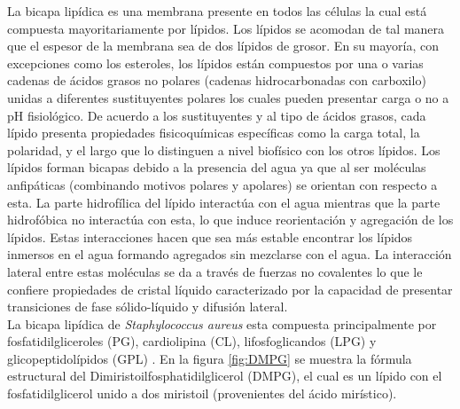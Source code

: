 \documentclass[12pt]{article}
\begin{document}
La bicapa lipídica es una membrana presente en todos las células la cual está compuesta mayoritariamente por lípidos. Los lípidos se acomodan de tal manera que el espesor de la membrana sea de dos lípidos de grosor. En su mayoría, con excepciones como los esteroles, los lípidos están compuestos por una o varias cadenas de ácidos grasos no polares (cadenas hidrocarbonadas con carboxilo) unidas a diferentes sustituyentes polares los cuales pueden presentar carga o no a pH fisiológico. De acuerdo a los sustituyentes y al tipo de ácidos grasos, cada lípido presenta propiedades fisicoquímicas específicas como la carga total, la polaridad, y el largo que lo distinguen a nivel biofísico con los otros lípidos. Los lípidos forman bicapas debido a la presencia del agua ya que al ser moléculas anfipáticas (combinando motivos polares y apolares) se orientan con respecto a esta. La parte hidrofílica del lípido interactúa con el agua mientras que la parte hidrofóbica no interactúa con esta, lo que induce reorientación y agregación de los lípidos. Estas interacciones hacen que sea más estable encontrar los lípidos inmersos en el agua formando agregados sin mezclarse con el agua. La interacci\'on lateral entre estas mol\'eculas se da a trav\'es de fuerzas no covalentes lo que le confiere propiedades de cristal l\'iquido caracterizado por la capacidad de presentar transiciones de fase s\'olido-l\'iquido y difusión lateral. \\

La bicapa lipídica de \textit{Staphylococcus aureus} esta compuesta principalmente por fosfatidilgliceroles (PG), cardiolipina (CL), lifosfoglicandos (LPG) y glicopeptidolípidos (GPL) \cite{Sohlenkamp2015BacterialPathways}. En la figura \ref{fig:DMPG} se muestra la fórmula estructural del Dimiristoilfosphatidilglicerol (DMPG), el cual es un lípido con el fosfatidilglicerol unido a dos miristoil (provenientes del ácido mirístico). 
\\
\end{document}
